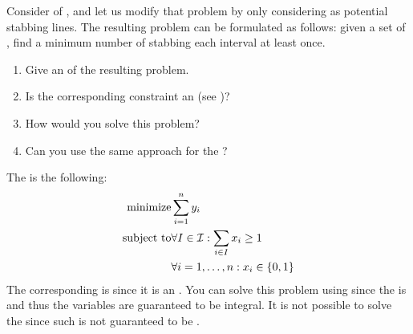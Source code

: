 \begin{exercise}
Consider  of , and let us modify that problem by only considering  as potential stabbing lines. The resulting problem can be formulated as follows: given a set of , find a minimum number of  stabbing each interval at least once.
\begin{enumerate}
 \item Give an  of the resulting problem.
 \item Is the corresponding constraint  an  (see )?
 \item How would you solve this problem?
 \item Can you use the same approach for the ?
\end{enumerate}
\end{exercise}
\begin{answer}
The  is the following:
\begin{eqnarray}
\mbox{minimize}&\sumieqb[i]{1}{n}{y_i}\eqnlab{rsv-m}\\
\mbox{subject to}&\forall I\in\calI:\sumdomain[i]{I}{x_{i}}\geq 1\eqnlab{rsv-c1}\\
&\forall\rangei[i]{1}{n}:x_i\in\accl{0,1}\eqnlab{rsv-c2}
\end{eqnarray}
The corresponding  is  since it is an . You can solve this problem using  since the  is  and thus the variables are guaranteed to be integral. It is not possible to solve the  since such  is not guaranteed to be .
\end{answer}
